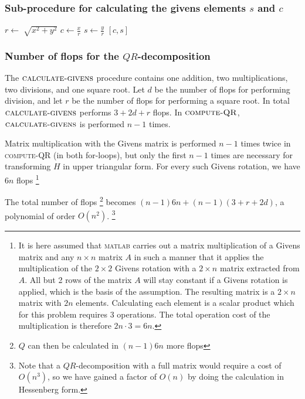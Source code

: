 \subsubsection*{Sub-procedure for calculating the givens elements $s$ and $c$}
\begin{algorithmic}
\State $r \gets \sqrt[]{x^2+y^2 }$ 
\State $c \gets \frac{x}{r} $
\State $s \gets \frac{y}{r} $
\State \Return $[c, s]$
\EndFunction
\end{algorithmic}

\subsubsection*{Number of flops for the $QR$-decomposition}
The $\textsc{calculate-givens}$ procedure contains one addition, two multiplications, two divisions, and one square root. 
Let $d$ be the number of flops for performing division, and let $r$ be the number of flops for performing a square root. 
In total $\textsc{calculate-givens}$ performs $3+2d+r$ flops. In $\textsc{compute-QR}$, $\textsc{calculate-givens}$ is performed $n-1$ times. 

Matrix multiplication with the Givens matrix is performed $n-1$ times twice in \textsc{compute-QR} (in both for-loops), but only the first $n-1$ times are necessary for transforming $H$ in upper triangular form. 
For every such Givens rotation, we have $6n$ flops \footnote{
It is here assumed that \textsc{matlab} carries out a matrix multiplication of a Givens matrix and any $n \times n$ matrix $A$ in such a manner that it applies the multiplication of the $2\times2$ Givens rotation with a $2\times n$ matrix extracted from $A$. 
All but 2 rows of the matrix $A$ will stay constant if a Givens rotation is applied, which is the basis of the assumption. 
The resulting matrix is a $2\times n$ matrix with $2n$ elements. 
Calculating each element is a scalar product which for this problem requires 3 operations. 
The total operation cost of the multiplication is therefore $2n\cdot 3=6n$. }

The total number of flops \footnote{$Q$ can then be calculated in $(n-1)6n$ more flops} becomes $(n-1)6n+(n-1)(3+r+2d)$, a polynomial of order $O(n^2)$. \footnote{Note that a $QR$-decomposition with a full matrix would require a cost of $O(n^3)$, so we have gained a factor of $O(n)$ by doing the calculation in Hessenberg form.}

